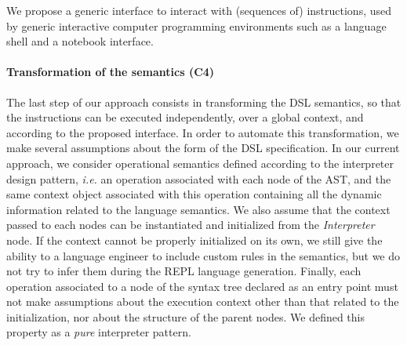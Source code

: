 We propose a generic interface to interact with (sequences of) instructions, used by generic interactive computer programming environments such as a language shell and a notebook interface. 

\paragraph{Transformation of the semantics (C4)}

The last step of our approach consists in transforming the DSL semantics, so that the instructions can be executed independently, over a global context, and according to the proposed interface. In order to automate this transformation, we make several assumptions about the form of the DSL specification. In our current approach, we consider operational semantics defined according to the interpreter design pattern, \emph{i.e.} an operation associated with each node of the AST, and the same context object associated with this operation containing all the dynamic information related to the language semantics. We also assume that the context passed to each nodes can be instantiated and initialized from the \textit{Interpreter} node. If the context cannot be properly initialized on its own, we still give the ability to a language engineer to include custom rules in the semantics, but we do not try to infer them during the REPL language generation. Finally, each operation associated to a node of the syntax tree declared as an entry point must not make assumptions about the execution context other than that related to the initialization, nor about the structure of the parent nodes. We defined this property as a \textit{pure} interpreter pattern. 













